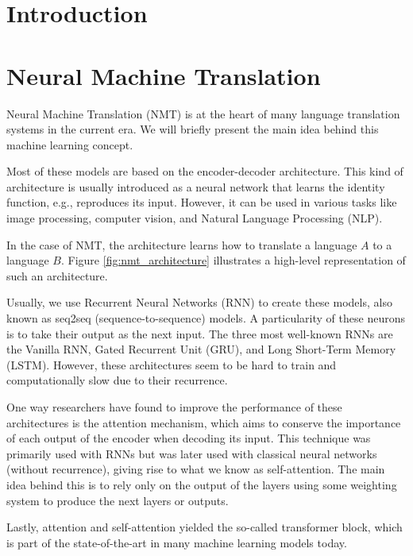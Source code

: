 \begin{abstract}
	
\end{abstract}

\section{Introduction}

\section{Neural Machine Translation}
Neural Machine Translation (NMT) is at the heart of many language translation systems in the current era. We will briefly present the main idea behind this machine learning concept.

Most of these models are based on the encoder-decoder architecture. This kind of architecture is usually introduced as a neural network that learns the identity function, e.g., reproduces its input. However, it can be used in various tasks like image processing, computer vision, and Natural Language Processing (NLP).

In the case of NMT, the architecture learns how to translate a language $A$ to a language $B$. Figure \ref{fig:nmt_architecture} illustrates a high-level representation of such an architecture.

Usually, we use Recurrent Neural Networks (RNN) to create these models, also known as seq2seq (sequence-to-sequence) models. A particularity of these neurons is to take their output as the next input. The three most well-known RNNs are the Vanilla RNN, Gated Recurrent Unit (GRU), and Long Short-Term Memory (LSTM). However, these architectures seem to be hard to train and computationally slow due to their recurrence.

One way researchers have found to improve the performance of these architectures is the attention mechanism, which aims to conserve the importance of each output of the encoder when decoding its input. This technique was primarily used with RNNs but was later used with classical neural networks (without recurrence), giving rise to what we know as self-attention. The main idea behind this is to rely only on the output of the layers using some weighting system to produce the next layers or outputs.

Lastly, attention and self-attention yielded the so-called transformer block, which is part of the state-of-the-art in many machine learning models today.


